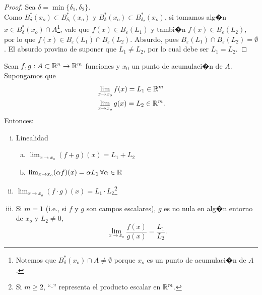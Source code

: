 \documentclass[a4paper]{scrartcl} %
\begin{document}
\begin{theorem}
\begin{proof}
 Sea $\delta = \min\{ \delta_1, \delta_2 \}$. \\
 Como $B_{\delta}^*(x_o) \subset B_{\delta_1}^*(x_o)$ y $B_{\delta}^*(x_o) \subset B_{\delta_2}^*(x_o)$, si tomamos alg�n $x \in B_{\delta}^*(x_o) \cap A$\footnote{Notemos que $B_{\delta}^*(x_o) \cap A \ne \emptyset$ porque $x_o$ es un punto de acumulaci�n de $A$.}, vale que $f(x) \in B_{\varepsilon}(L_1)$ y tambi�n $f(x) \in B_{\varepsilon}(L_2)$, por lo que $f(x) \in B_{\varepsilon}(L_1) \cap B_{\varepsilon}(L_2)$. Absurdo, pues $B_{\varepsilon}(L_1) \cap B_{\varepsilon}(L_2) = \emptyset$. El absurdo provino de suponer que $L_1 \ne L_2$, por lo cual debe ser $L_1 = L_2$.

\end{proof}

\end{theorem}
\begin{propiedad} \label{prop:alg_lim} Sean $f,g:A \subset \mathbb{R}^n \to \mathbb{R}^m$ funciones y $x_0$ un punto de acumulaci�n de $A$. Supongamos que 
  \begin{align*}
   &\lim_{x \to x_o} f(x) = L_1 \in \mathbb{R}^m \\
   &\lim_{x \to x_o} g(x) = L_2 \in \mathbb{R}^m.
  \end{align*}
  Entonces:
  \begin{enumerate} [i.]
   \item Linealidad
      \begin{enumerate} [(a)]
       \item $\lim_{x \to x_o} (f + g)(x) = L_1 + L_2$
       \item $\lim_{x \to x_o} (\alpha f)(x) = \alpha L_1 \, \forall \alpha \in \mathbb{R}$
      \end{enumerate}
  \item $\lim_{x \to x_o} (f \cdot g) (x) = L_1 \cdot L_2$\footnote{Si $m \ge 2$, ``$\cdot$'' representa el producto escalar en $\mathbb{R}^m$.}
  \item Si $m = 1$ (i.e., si $f \text{ y } g$ son campos escalares), $g$ es no nula en alg�n entorno de $x_o$ y $L_2 \ne 0$, 
  \[
   \lim_{x \to x_o} \frac{f(x)}{g(x)} = \frac{L_1}{L_2}.
  \]
  \end{enumerate}
\end{propiedad}
\end{document}
